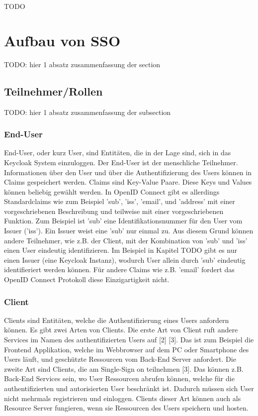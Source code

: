 TODO


\section{Aufbau von SSO}

TODO: hier 1 absatz zusammenfassung der section

\subsection{Teilnehmer/Rollen}

TODO: hier 1 absatz zusammenfassung der subsection

\subsubsection{End-User} \label{EB_End-User}

End-User, oder kurz User, sind Entitäten, die in der Lage sind, sich in das Keycloak System einzuloggen. Der End-User ist der menschliche Teilnehmer. Informationen über den User und über die Authentifizierung des Users können in Claims gespeichert werden. Claims sind Key-Value Paare. Diese Keys und Values können beliebig gewählt werden. In OpenID Connect gibt es allerdings Standardclaims wie zum Beispiel 'sub', 'iss', 'email', und 'address' mit einer vorgeschriebenen Beschreibung und teilweise mit einer vorgeschriebenen Funktion. Zum Beispiel ist 'sub' eine Identifikationsnummer für den User vom Issuer ('iss'). Ein Issuer weist eine 'sub' nur einmal zu. Aus diesem Grund können andere Teilnehmer, wie z.B. der Client, mit der Kombination von 'sub' und 'iss' einen User eindeutig identifizieren. Im Beispiel in Kapitel TODO gibt es nur einen Issuer (eine Keycloak Instanz), wodurch User allein durch 'sub' eindeutig identifieriert werden können. Für andere Claims wie z.B. 'email' fordert das OpenID Connect Protokoll diese Einzigartigkeit nicht.

\subsubsection{Client}

Clients sind Entitäten, welche die Authentifizierung eines Users anfordern können. Es gibt zwei Arten von Clients. Die erste Art von Client ruft andere Services im Namen des authentifizierten Users auf [2] [3]. Das ist zum Beispiel die Frontend Applikation, welche im Webbrowser auf dem PC oder Smartphone des Users läuft, und geschützte Ressourcen vom Back-End Server anfordert. Die zweite Art sind Clients, die am Single-Sign on teilnehmen [3]. Das können z.B. Back-End Services sein, wo User Ressourcen abrufen können, welche für die authentifizierten und autorisierten User beschränkt ist. Dadurch müssen sich User nicht mehrmals registrieren und einloggen. Clients dieser Art können auch als Resource Server fungieren, wenn sie Ressourcen des Users speichern und hosten.

